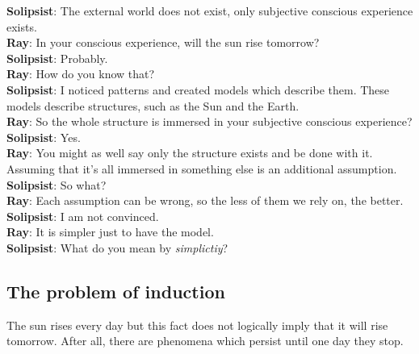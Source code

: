 {\setlength\parindent{0pt}
\textbf{Solipsist}: The external world does not exist, only subjective conscious experience exists.\\

\textbf{Ray}: In your conscious experience, will the sun rise tomorrow?\\

\textbf{Solipsist}: Probably.\\

\textbf{Ray}: How do you know that?\\

\textbf{Solipsist}: I noticed patterns and created models which describe them. These models describe structures, such as the Sun and the Earth.\\

\textbf{Ray}: So the whole structure is immersed in your subjective conscious experience?\\

\textbf{Solipsist}: Yes.\\

\textbf{Ray}: You might as well say only the structure exists and be done with it. Assuming that it's all immersed in something else is an additional assumption.\\

\textbf{Solipsist}: So what?\\

\textbf{Ray}: Each assumption can be wrong, so the less of them we rely on, the better.\\

\textbf{Solipsist}: I am not convinced.\\

\textbf{Ray}: It is simpler just to have the model.\\

\textbf{Solipsist}: What do you mean by \textit{simplictiy}?\\
}

\newpage

\subsection{The problem of induction}

The sun rises every day but this fact does not logically imply that it will rise tomorrow.
After all, there are phenomena which persist until one day they stop.\\

